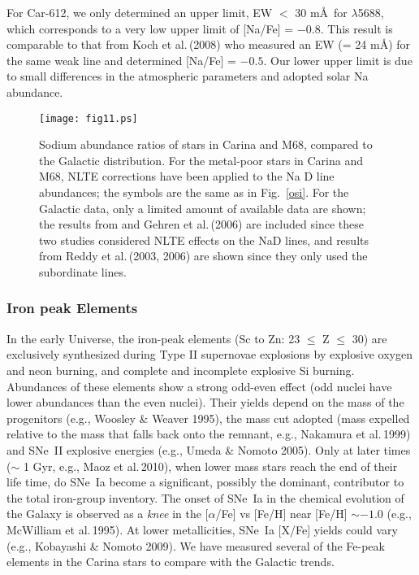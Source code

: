 \documentclass{emulateapj}
\newcommand\etal{{\rm et al.\,}}
\begin{document}
For Car-612, we only determined an upper limit, EW $<$ 30 m\AA\ for
 $\lambda$5688, which corresponds to a very low upper limit 
of [Na/Fe] = $-0.8$.  This result is comparable to that from 
Koch \etal (2008) who measured an EW (= 24 m\AA) for the same weak 
line and determined [Na/Fe] = $-0.5$.  Our lower upper limit is due
to small differences in the atmospheric parameters and adopted solar 
Na abundance.



\begin{figure}[t]
\texttt{[image: fig11.ps]}
\caption{Sodium abundance ratios of stars in Carina and M68,
compared to the Galactic distribution.   For the metal-poor
stars in Carina and M68, NLTE corrections have been applied 
to the Na D line abundances; the symbols are the same as in 
Fig.~\ref{osi}.     For the Galactic data, only a limited
amount of available data are shown; the results from 
\citep{And07} and Gehren \etal (2006) are included
since these two studies considered NLTE effects on the NaD
lines, and results from Reddy \etal (2003, 2006) are shown
since they only used the subordinate  lines.
}
\label{na}
\end{figure}



\subsubsection {Iron peak Elements }

In the early Universe, the iron-peak elements (Sc to Zn:
23 $\le$ Z $\le$ 30) are exclusively synthesized during 
Type II supernovae explosions by explosive oxygen and
neon burning, and complete and incomplete explosive Si
burning.     Abundances of these elements show a strong
odd-even effect (odd nuclei have lower abundances than
the even nuclei).  Their yields depend on the mass of
the progenitors (e.g., Woosley \& Weaver 1995), the 
mass cut adopted (mass expelled relative to the mass that 
falls back onto the remnant, e.g., Nakamura \etal  1999) 
and SNe~II explosive energies (e.g., Umeda \& Nomoto 2005). 
%
Only at later times ($\sim$ 1 Gyr, e.g., Maoz \etal  2010), 
when lower mass stars reach the end of their life time, 
do SNe~Ia become a significant, possibly
the dominant, contributor to the total iron-group inventory.
The onset of SNe~Ia in the chemical evolution of the Galaxy
is observed as a {\it knee} in the [$\alpha$/Fe] vs [Fe/H]
near [Fe/H] $\sim -1.0$ (e.g., McWilliam \etal  1995). At
lower metallicities, SNe~Ia [X/Fe] yields could vary
(e.g., Kobayashi \& Nomoto 2009). 
We have measured several of the Fe-peak elements 
in the Carina stars to compare with the Galactic trends.  
\end{document}

